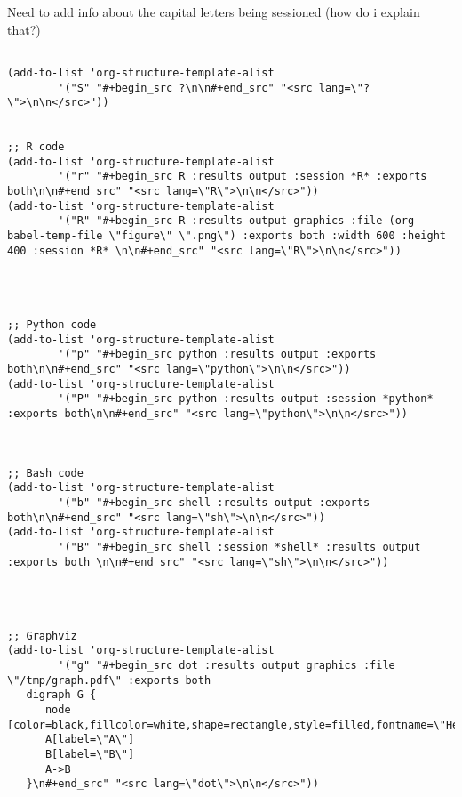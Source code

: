 \documentclass[11pt]{article}
\begin{document}
Need to add info about the capital letters being sessioned (how do i explain that?)
\begin{verbatim}

(add-to-list 'org-structure-template-alist
        '("S" "#+begin_src ?\n\n#+end_src" "<src lang=\"?\">\n\n</src>"))


;; R code
(add-to-list 'org-structure-template-alist
        '("r" "#+begin_src R :results output :session *R* :exports both\n\n#+end_src" "<src lang=\"R\">\n\n</src>"))
(add-to-list 'org-structure-template-alist
        '("R" "#+begin_src R :results output graphics :file (org-babel-temp-file \"figure\" \".png\") :exports both :width 600 :height 400 :session *R* \n\n#+end_src" "<src lang=\"R\">\n\n</src>"))




;; Python code
(add-to-list 'org-structure-template-alist
        '("p" "#+begin_src python :results output :exports both\n\n#+end_src" "<src lang=\"python\">\n\n</src>"))
(add-to-list 'org-structure-template-alist
        '("P" "#+begin_src python :results output :session *python* :exports both\n\n#+end_src" "<src lang=\"python\">\n\n</src>"))



;; Bash code
(add-to-list 'org-structure-template-alist
        '("b" "#+begin_src shell :results output :exports both\n\n#+end_src" "<src lang=\"sh\">\n\n</src>"))
(add-to-list 'org-structure-template-alist
        '("B" "#+begin_src shell :session *shell* :results output :exports both \n\n#+end_src" "<src lang=\"sh\">\n\n</src>"))




;; Graphviz
(add-to-list 'org-structure-template-alist
        '("g" "#+begin_src dot :results output graphics :file \"/tmp/graph.pdf\" :exports both
   digraph G {
      node [color=black,fillcolor=white,shape=rectangle,style=filled,fontname=\"Helvetica\"];
      A[label=\"A\"]
      B[label=\"B\"]
      A->B
   }\n#+end_src" "<src lang=\"dot\">\n\n</src>"))
\end{verbatim}
\end{document}
